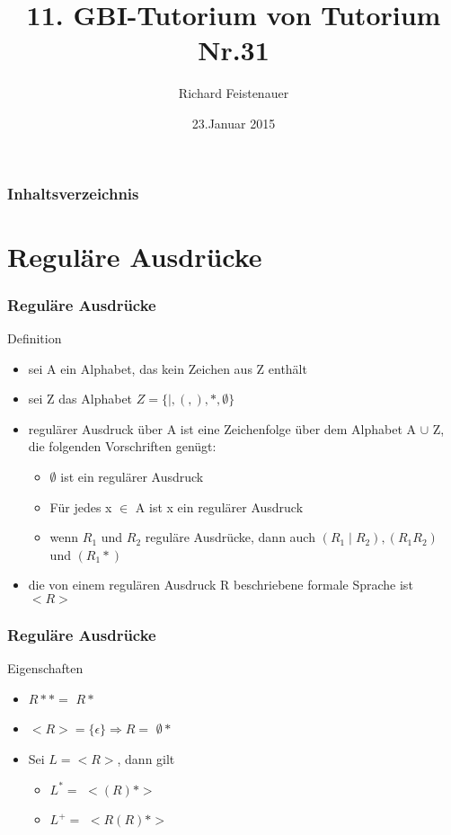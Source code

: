 \documentclass{beamer}
\author{Richard Feistenauer}
\title{11. GBI-Tutorium von Tutorium Nr.31}
\date{23.Januar 2015}
\begin{document}
\begin {frame}
	\titlepage
\end {frame}

\begin {frame}
	\frametitle {Inhaltsverzeichnis}
	\tableofcontents
\end {frame}

\section{Reguläre Ausdrücke}

\begin{frame}
	\frametitle{Reguläre Ausdrücke}
	\begin{block}{Definition}
		\begin{itemize}
			\item sei A ein Alphabet, das kein Zeichen aus Z enthält
			\item sei Z das Alphabet $Z = \{ \mid , (,), \ast , \emptyset \}$
			\item regulärer Ausdruck über A ist eine Zeichenfolge über dem Alphabet A 	$\cup $ Z, die folgenden Vorschriften genügt:
			\pause
				\begin{itemize}
					\item $\emptyset$ ist ein regulärer Ausdruck
					\pause
					\item Für jedes x $\in$ A ist x ein regulärer Ausdruck
					\pause
					\item wenn $R_1$ und $R_2$ reguläre Ausdrücke, dann auch $(R_1 \mid R_2),(R_1 R_2)$ und $(R_1 \ast )$
				\end{itemize}
				\pause
			\item die von einem regulären Ausdruck R beschriebene formale Sprache ist $<R>$
		\end{itemize}
	\end{block}
\end{frame}

\begin{frame}
	\frametitle{Reguläre Ausdrücke}
	\begin{block}{Eigenschaften}
		\begin{itemize}
			\item $R \ast \ast = $ \pause $R\ast$
			\item $<R> = \{ \epsilon \} \Rightarrow R =$ \pause $ \emptyset \ast $
			\item Sei $L = <R>$, dann gilt
				\begin{itemize}
					\item $L^{\ast} = $ \pause $<(R) \ast >$
					\item $L^+ = $ \pause $<R(R) \ast > $
				\end{itemize}
		\end{itemize}
	\end{block}
\end{frame}
\end{document}
